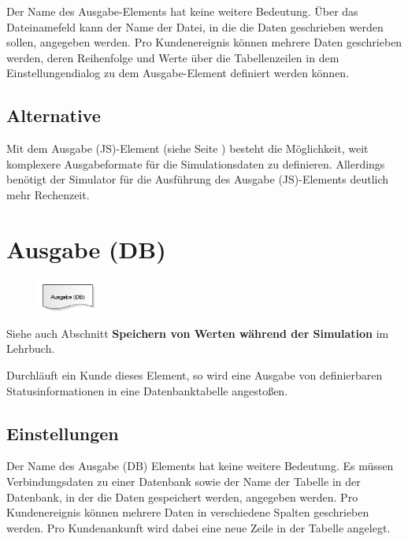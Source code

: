 Der Name des Ausgabe-Elements hat keine weitere Bedeutung. Über das Dateinamefeld kann der Name der Datei,
in die die Daten geschrieben werden sollen, angegeben werden. Pro Kundenereignis können mehrere Daten
geschrieben werden, deren Reihenfolge und Werte über die Tabellenzeilen in dem Einstellungendialog zu
dem Ausgabe-Element definiert werden können.

\subsection*{Alternative}

Mit dem Ausgabe (JS)-Element (siehe Seite \pageref{ref:ModelElementOutputJS}) besteht die Möglichkeit, weit komplexere
Ausgabeformate für die Simulationsdaten zu definieren. Allerdings benötigt der Simulator für die Ausführung
des Ausgabe (JS)-Elements deutlich mehr Rechenzeit.


\section{Ausgabe (DB)}
\label{ref:ModelElementOutputDB}

\begin{figure}
\vspace{-22pt}
\includegraphics[width=2cm]{imageModelElementOutputDB.png}
\vspace{-22pt}
\end{figure}

Siehe auch Abschnitt \textbf{Speichern von Werten während der Simulation} im Lehrbuch.

Durchläuft ein Kunde dieses Element, so wird eine Ausgabe von definierbaren Statusinformationen in eine
Datenbanktabelle angestoßen.

\subsection*{Einstellungen}

Der Name des Ausgabe (DB) Elements hat keine weitere Bedeutung. Es müssen Verbindungsdaten zu einer
Datenbank sowie der Name der Tabelle in der Datenbank, in der die Daten gespeichert werden, angegeben werden.
Pro Kundenereignis können mehrere Daten in verschiedene Spalten geschrieben werden. Pro Kundenankunft
wird dabei eine neue Zeile in der Tabelle angelegt.


